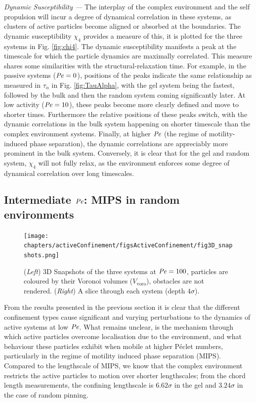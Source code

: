 \textit{Dynamic Susceptibility ---} The interplay of the complex environment and the self propulsion will incur a degree of dynamical correlation in these systems, as clusters of active particles become aligned or absorbed at the boundaries. The dynamic susceptibility $\chi_4$ provides a measure of this, it is plotted for the three systems in Fig. \ref{fig:chi4}. The dynamic susceptibility manifests a peak at the timescale for which the particle dynamics are maximally correlated. This measure shares some similarities with the structural-relaxation time. For example, in the passive systems ($\operatorname{\mathit{P\kern-.08em e}}=0$), positions of the peaks indicate the same relationship as measured in $\tau_{\alpha}$ in Fig. \ref{fig:TauAlpha}, with the gel system being the fastest, followed by the bulk and then the random system coming significantly later. At low activity ($\operatorname{\mathit{P\kern-.08em e}}=10$), these peaks become more clearly defined and move to shorter times. Furthermore the relative positions of these peaks switch, with the dynamic correlations in the bulk system  happening on shorter timescale than the complex environment systems. Finally, at higher $\operatorname{\mathit{P\kern-.08em e}}$ (the regime of motility-induced phase separation), the dynamic correlations are appreciably more prominent in the bulk system. Conversely, it is clear that for the gel and random system, $\chi_4$ will not fully relax, as the environment enforces some degree of dynamical correlation over long timescales.

\subsection{Intermediate $\operatorname{\mathit{P\kern-.08em e}}$: MIPS in random environments}

\begin{figure}
	\centering
	\texttt{[image: chapters/activeConfinement/figsActiveConfinement/fig3D\_snapshots.png]}
	\caption[MIPS in the bulk, gel and pinning systems]{(\textit{Left}) 3D Snapshots of the three systems at $\operatorname{\mathit{P\kern-.08em e}} = 100$, particles are coloured by their Voronoi volumes ($V_{\textrm{voro}}$), obstacles are not rendered. (\textit{Right}) A slice through each system (depth $4\sigma$).}
	\label{fig:fig3D_snapshots}
\end{figure}


From the results presented in the previous section it is clear that the different confinement types cause significant and varying perturbations to the dynamics of active systems at low $\operatorname{\mathit{P\kern-.08em e}}$. What remains unclear, is the mechanism through which active particles overcome localisation due to the environment, and what behaviour these particles exhibit when mobile at higher Péclet numbers, particularly in the regime of motility induced phase separation (MIPS). 
Compared to the lengthscale of MIPS, we know that the complex environment restricts the active particles to motion over shorter lengthscales; from the chord length measurements, the confining lengthscale is $6.62\sigma$ in the gel and $3.24\sigma$ in the case of random pinning. 
 
